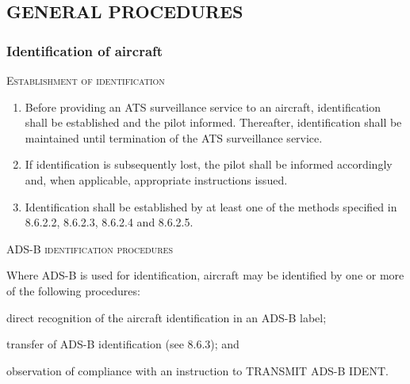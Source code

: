 \subsection[General procedures]{GENERAL PROCEDURES}


\subsubsection{Identification of aircraft}

\begin{enumeratesc}
    \item \textsc{Establishment of identification}
    \begin{enumerate}
        \item Before providing an ATS surveillance service to an aircraft, identification shall be established and the pilot informed. Thereafter, identification shall be maintained until termination of the ATS surveillance service.
        \item If identification is subsequently lost, the pilot shall be informed accordingly and, when applicable, appropriate instructions issued.
        \item Identification shall be established by at least one of the methods specified in 8.6.2.2, 8.6.2.3, 8.6.2.4 and 8.6.2.5.
    \end{enumerate}

    \item \textsc{ADS-B identification procedures}
    \begin{enumempty}
        \item Where ADS-B is used for identification, aircraft may be identified by one or more of the following procedures:
    \end{enumempty}
    \begin{enumalph}
        \item direct recognition of the aircraft identification in an ADS-B label;
        \item transfer of ADS-B identification (see 8.6.3); and
        \item observation of compliance with an instruction to TRANSMIT ADS-B IDENT.
    \end{enumalph}
    

\end{enumeratesc}
